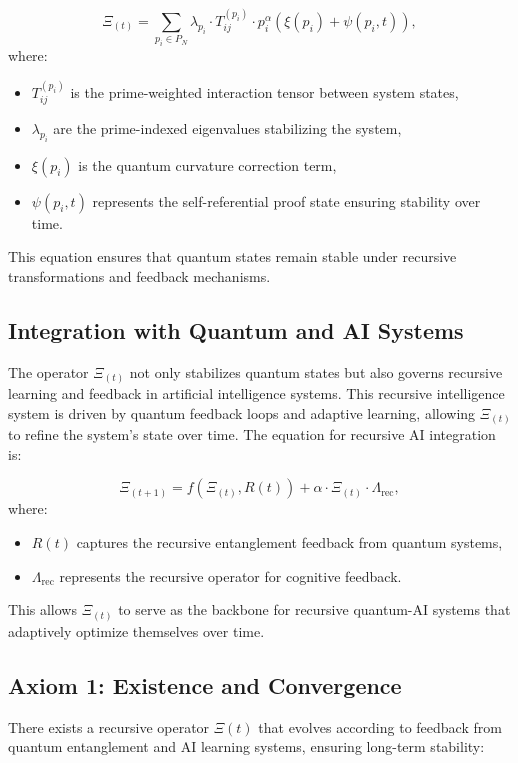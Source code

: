 \documentclass{article}
\theoremstyle{plain}
\begin{document}
\[
\Xi_(t) = \sum_{p_i \in P_N} \lambda_{p_i} \cdot T_{ij}^{(p_i)} \cdot p_i^{\alpha} \left( \xi(p_i) + \psi(p_i, t) \right),
\]
where:
\begin{itemize}
    \item $T_{ij}^{(p_i)}$ is the prime-weighted interaction tensor between system states,
    \item $\lambda_{p_i}$ are the prime-indexed eigenvalues stabilizing the system,
    \item $\xi(p_i)$ is the quantum curvature correction term,
    \item $\psi(p_i, t)$ represents the self-referential proof state ensuring stability over time.
\end{itemize}

This equation ensures that quantum states remain stable under recursive transformations and feedback mechanisms.

\subsection{Integration with Quantum and AI Systems}
The operator $\Xi_(t)$ not only stabilizes quantum states but also governs recursive learning and feedback in artificial intelligence systems. This recursive intelligence system is driven by quantum feedback loops and adaptive learning, allowing $\Xi_(t)$ to refine the system's state over time. The equation for recursive AI integration is:

\[
\Xi_(t+1) = f(\Xi_(t), R(t)) + \alpha \cdot \Xi_(t) \cdot \Lambda_{\text{rec}},
\]
where:
\begin{itemize}
    \item $R(t)$ captures the recursive entanglement feedback from quantum systems,
    \item $\Lambda_{\text{rec}}$ represents the recursive operator for cognitive feedback.
\end{itemize}

This allows $\Xi_(t)$ to serve as the backbone for recursive quantum-AI systems that adaptively optimize themselves over time.

\subsection{Axiom 1: Existence and Convergence}
There exists a recursive operator \(\Xi(t)\) that evolves according to feedback from quantum entanglement and AI learning systems, ensuring long-term stability:
\end{document}
